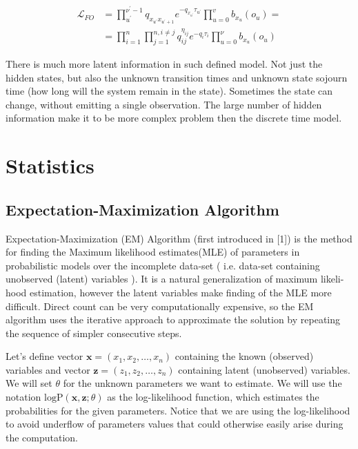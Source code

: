 \documentclass[thesis=M,english]{FITthesis}[2012/10/20]
\begin{document}
\begin{equation}\label{eq:HMCL1}
\begin{aligned}  
 \mathcal{L}_{FO} &= \prod_{u^{'}}^{\nu^{'}-1} q_{x_{u^{'}} x_{u^{'}+1}} e^{ - q_{x_{u^{'}}} \tau_{u^{'}} } 
    \prod_{u=0}^v b_{ x_u }(o_u) = \\
    &= \prod_{i=1}^{n} \prod_{j=1}^{n, i \neq j} q_{ij}^{\eta_{ij} } e^{ - q_i \tau_i } \prod_{u=0}^\nu b_{x_u}(o_u)
\end{aligned}
\end{equation}

There is much more latent information in such defined model. Not just the hidden states, but also the unknown transition times and unknown state sojourn time (how long will the system remain in the state).
Sometimes the state can change, without emitting a single observation. The large number of hidden information make it to be more complex problem then the discrete time model.

\chapter{Statistics}


\section{Expectation-Maximization Algorithm}\label{ch:EM}



Expectation-Maximization (EM) Algorithm (first introduced in [1]) is the method for finding the Maximum likelihood estimates(MLE) of parameters in probabilistic models over the incomplete data-set ( i.e. data-set containing unobserved (latent) variables ). It is a natural generalization of maximum likeli-
hood estimation, however the latent variables make finding of the MLE more difficult. Direct count can be very computationally expensive, so the EM algorithm uses the iterative approach to approximate the solution by repeating the sequence of simpler consecutive steps.

Let's define vector $\mathbf{x} = (x_{1},x_{2},\dotsc,x_{n})$ containing the known (observed) variables and vector $\mathbf{z} = (z_{1},z_{2},\dotsc,z_{n})$ containing latent (unobserved) variables. We will set $\theta$ for the unknown parameters we want to estimate. We will use the notation $\mathrm{logP}(\mathbf{x},\mathbf{z};\theta)$ as the log-likelihood function, which estimates the probabilities for the given parameters. Notice that we are using the log-likelihood to avoid underflow of parameters values that could otherwise easily arise during the computation.  
\end{document}
